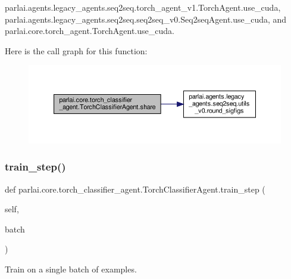 parlai.\+agents.\+legacy\+\_\+agents.\+seq2seq.\+torch\+\_\+agent\+\_\+v1.\+Torch\+Agent.\+use\+\_\+cuda, parlai.\+agents.\+legacy\+\_\+agents.\+seq2seq.\+seq2seq\+\_\+v0.\+Seq2seq\+Agent.\+use\+\_\+cuda, and parlai.\+core.\+torch\+\_\+agent.\+Torch\+Agent.\+use\+\_\+cuda.

Here is the call graph for this function\+:
\nopagebreak
\begin{figure}[H]
\begin{center}
\leavevmode
\includegraphics[width=350pt]{classparlai_1_1core_1_1torch__classifier__agent_1_1TorchClassifierAgent_a33e56566ee5e81b257b049bd6a3c1cd6_cgraph}
\end{center}
\end{figure}
\mbox{\label{classparlai_1_1core_1_1torch__classifier__agent_1_1TorchClassifierAgent_a3baacdb005c5f5a6367c45c93d21d398}} 
\subsubsection{\texorpdfstring{train\+\_\+step()}{train\_step()}}
{\footnotesize\ttfamily def parlai.\+core.\+torch\+\_\+classifier\+\_\+agent.\+Torch\+Classifier\+Agent.\+train\+\_\+step (\begin{DoxyParamCaption}\item[{}]{self,  }\item[{}]{batch }\end{DoxyParamCaption})}

\begin{DoxyVerb}Train on a single batch of examples.\end{DoxyVerb}
 

